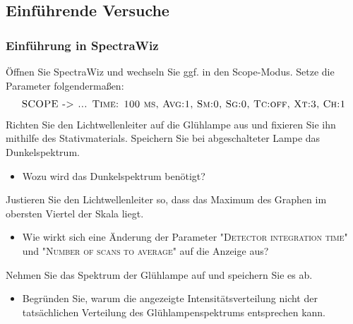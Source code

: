 \subsection{Einführende Versuche}
\subsubsection{Einführung in SpectraWiz}
Öffnen Sie SpectraWiz und wechseln Sie ggf. in den Scope-Modus. Setze die Parameter folgendermaßen:
\begin{displaymath}
	\mathrm{\textsc{SCOPE -> ... Time: 100 ms, Avg:1, Sm:0, Sg:0, Tc:off, Xt:3, Ch:1}}
\end{displaymath}
Richten Sie den Lichtwellenleiter auf die Glühlampe aus und fixieren Sie ihn mithilfe des Stativmaterials. Speichern Sie bei abgeschalteter Lampe das Dunkelspektrum.
\begin{itemize}[label=$\blacktriangleright$]
	\item Wozu wird das Dunkelspektrum benötigt?
\end{itemize}
Justieren Sie den Lichtwellenleiter so, dass das Maximum des Graphen im obersten Viertel der Skala liegt.
\begin{itemize}[label=$\blacktriangleright$]
	\item Wie wirkt sich eine Änderung der Parameter "\textsc{Detector integration time}" und "\textsc{Number of scans to average}" auf die Anzeige aus?
\end{itemize}
Nehmen Sie das Spektrum der Glühlampe auf und speichern Sie es ab. 
\begin{itemize}[label=$\blacktriangleright$]
	\item Begründen Sie, warum die angezeigte Intensitätsverteilung nicht der tatsächlichen Verteilung des Glühlampenspektrums entsprechen kann.
\end{itemize}
